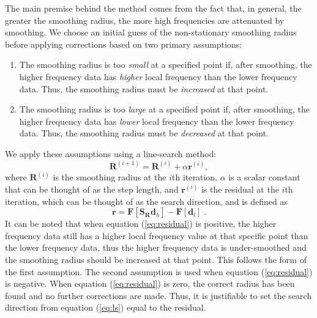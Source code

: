         The main premise behind the method comes from the fact that, in general, 
        the greater the smoothing radius, the more high frequencies are attenuated by smoothing.
        We choose an initial guess of the non-stationary smoothing radius before applying
        corrections based on two primary assumptions:
        \begin{enumerate}
        \item The smoothing radius is too \emph{small} at a specified point if, after smoothing, the
                higher frequency data has \emph{higher} local frequency than the lower frequency
                data. Thus, the smoothing radius must be \emph{increased} at that point. 
        \item The smoothing radius is too \emph{large} at a specified point if, after smoothing, the
                higher frequency data has \emph{lower} local frequency than the lower frequency
                data. Thus, the smoothing radius must be \emph{decreased} at that point.
        \end{enumerate}
        We apply these assumptions using a line-search method:
                        \begin{equation}
                               \label{eq:ls}
                               \mathbf{R}^{(i+1)} = \mathbf{R}^{(i)}+ \alpha \mathbf{r}^{(i)},
                        \end{equation}
        where $\mathbf{R}^{(i)}$ is the smoothing radius at the $i$th iteration, $\alpha$ is a
        scalar constant that can be thought of as the step length, and $\mathbf{r}^{(i)}$ is the
        residual at the $i$th iteration, which can be thought of as the search direction, and is
        defined as
          \begin{equation}
                \label{eq:residual}
                \mathbf{r} = \mathbf{F}[\mathbf{S}_{\mathbf{R}} \mathbf{d}_h] - \mathbf{F}[\mathbf{d}_l]\;.
          \end{equation}
        It can be noted that when equation (\ref{eq:residual}) is positive, the higher frequency
        data still has a higher local frequency value at that specific point than the lower
        frequency data, thus the higher frequency data is under-smoothed and the smoothing radius
        should be increased at that point. This follows the form of the first assumption. The second
        assumption is used when equation (\ref{eq:residual}) is negative. When equation
        (\ref{eq:residual}) is zero, the correct radius has been found and no further corrections
        are made. Thus, it is justifiable to set the search direction from equation (\ref{eq:ls})
        equal to the residual.
        
